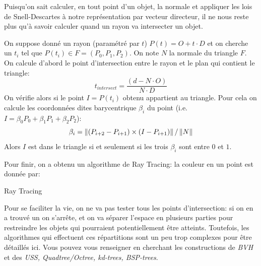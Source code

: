 \documentclass{classe}
\begin{document}
Puisqu'on sait calculer, en tout point d'un objet, la normale et appliquer les lois de Snell-Descartes à notre représentation par vecteur directeur, il ne nous reste plus qu'à savoir calculer quand un rayon va intersecter un objet.

On suppose donné un rayon (paramétré par $t$) $P(t) = O+ t\cdot D$ et on cherche un $t_{i}$ tel que $P(t_{i}) \in F = (P_{0}, P_{1}, P_{2})$.
On note $N$ la normale du triangle $F$.
On calcule d'abord le point d'intersection entre le rayon et le plan qui contient le triangle:
\begin{equation*}
	t_{intersect} = \frac{\left(d - N\cdot O\right)}{N \cdot D}
\end{equation*}
On vérifie alors si le point $I = P(t_{i})$ obtenu appartient au triangle. Pour cela on calcule les coordonnées dites barycentrique $\beta_{i}$ du point (i.e. $I = \beta_{0}P_{0} + \beta_{1}P_{1} + \beta_{2}P_{2}$):
\begin{equation*}
	\beta_{i} = \left\lVert \left(P_{i + 2} - P_{i + 1}\right) \times \left(I - P_{i + 1}\right) \right\rVert/\left\lVert N \right\rVert
\end{equation*}
Alors $I$ est dans le triangle si et seulement si les trois $\beta_{i}$ sont entre $0$ et $1$.

Pour finir, on a obtenu un algorithme de Ray Tracing: la couleur en un point est donnée par:
\begin{algorithm}[H]
	\caption{Ray Tracing}
	\begin{algorithmic}
				\Else
				\EndIf
			\EndIf
		\EndFunction
	\end{algorithmic}
\end{algorithm}

Pour se faciliter la vie, on ne va pas tester tous les points d'intersection: si on en a trouvé un on s'arrête, et on va séparer l'espace en plusieurs parties pour restreindre les objets qui pourraient potentiellement être atteints.
Toutefois, les algorithmes qui effectuent ces répartitions sont un peu trop complexes pour être détaillés ici.
Vous pouvez vous renseigner en cherchant les constructions de \emph{BVH} et des \emph{USS, Quadtree/Octree, kd-trees, BSP-trees}.
\end{document}

